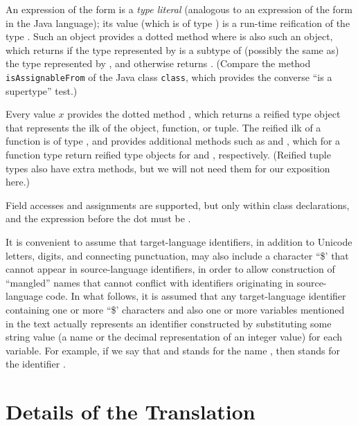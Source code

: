 An expression of the form  is a \emph{type literal}
(analogous to an expression of the form  in the Java language);
its value (which is of type ) is a run-time reification of the type .  Such an object
provides a dotted method  where  is also such an object,
which returns  if the type represented by  is a subtype of
(possibly the same as) the type represented by , and otherwise
returns .  (Compare the method {\tt isAssignableFrom} of the Java class {\tt class},
which provides the converse ``is a supertype'' test.)

Every value $x$ provides the dotted method , which returns
a reified type object that represents the ilk of the object, function, or tuple.
The reified ilk of a function is of type ,
and provides additional methods such as  and ,
which for a function type  return reified type objects for  and , respectively.
(Reified tuple types also have extra methods, but
we will not need them for our exposition here.)

Field accesses and assignments are supported, but only within class declarations,
and the expression before the dot must be .

It is convenient to assume that target-language 
identifiers, in addition to Unicode letters, digits, and connecting punctuation,
may also include a character ``\$' that cannot appear in source-language identifiers,
in order to allow construction of ``mangled'' names that cannot conflict with
identifiers originating in source-language code.
In what follows, it is assumed
that any target-language identifier containing one or more ``\$' characters
and also one or more variables mentioned in the text actually represents
an identifier constructed by substituting some string value (a name or
the decimal representation of an integer value) for each variable.
For example, if we say that  and  stands for the name ,
then  stands for the identifier .




\section{Details of the Translation}

